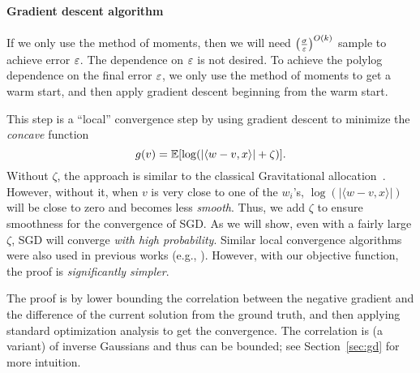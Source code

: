 \paragraph{Gradient descent algorithm}
If we only use the method of moments, then we will need $\left(\frac{\sigma}{\varepsilon}\right)^{O(k)}$ sample to achieve error $\varepsilon$. The dependence on $\varepsilon$ is not desired. To achieve the polylog dependence on the final error $\varepsilon$, we only use the method of moments to get a warm start, and then apply gradient descent beginning from the warm start. 

This step is a ``local'' convergence step by using gradient descent to minimize the \emph{concave} function
$$
  g(v) = \mathbb{E}[\log(|\langle w - v, x \rangle| + \zeta)].
$$
Without $\zeta$, the approach is similar to the classical Gravitational allocation~\citep{holden2017gravitational}. However, without it, when $v$ is very close to one of the $w_i$'s,  $\log(|\langle w - v, x \rangle| )$ will be close to zero and becomes less \emph{smooth}. Thus, we add $\zeta$ to ensure smoothness for the convergence of SGD. As we will show, even with a fairly large $\zeta$, SGD will converge \emph{with high probability}. Similar local convergence algorithms were also used in previous works (e.g., \citep{klusowski2017estimating}). However, with our objective function, the proof is \emph{significantly simpler}. 
 
The proof is by lower bounding the correlation between the negative gradient and the difference of the current solution from the ground truth, and then applying standard optimization analysis to get the convergence. The correlation is (a variant) of inverse Gaussians and thus can be bounded; see Section~\ref{sec:gd} for more intuition.






